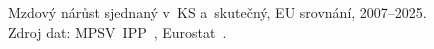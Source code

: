 \def\strStavIppMzdyTitle{Sjednaný vs.~skutečný mzdový nárůst v~\aca{geo-CZ}}%
\def\strStavIppMzdyCaption{Mzdový nárůst sjednaný v~\acs{KS} a~skutečný, \acs{EU} srovnání, 2007--2025. Zdroj dat: \acs{MPSV}~\acs{IPP}~\cite{mpsv_ipp}, Eurostat~\cite{eurostat_lci}.}%
%

\providecommand\NudgeStavIppMzdyCz{10pt}%
\providecommand\NudgeStavIppMzdyAt{-8pt}%
\providecommand\NudgeStavIppMzdyDe{0pt}%
\providecommand\NudgeStavIppMzdyDk{-12pt}%
\providecommand\NudgeStavIppMzdyPl{0pt}%
\providecommand\NudgeStavIppMzdySk{0pt}%
\providecommand\NudgeStavIppMzdySjednany{0pt}%
\begin{figure}[H]
  \centering
  
  \caption{\strStavIppMzdyCaption}
  \label{fig:stav_ipp_mzdy}
\end{figure}
